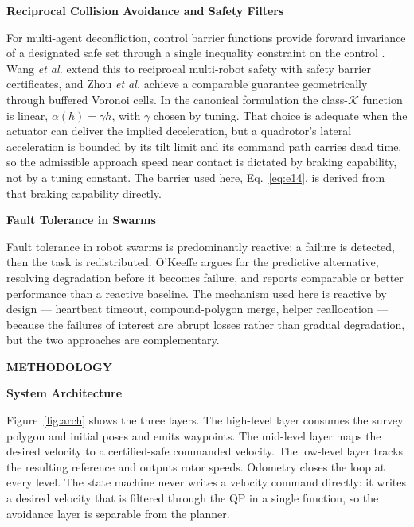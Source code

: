 \documentclass[10pt,letterpaper]{article}
\newcommand{\headingone}[1]{%
    \par\vspace{9pt}%
    {\centering\fontsize{12}{14}\selectfont\bfseries\MakeUppercase{#1}\par}%
    \vspace{4pt}\noindent\ignorespaces}
\newcommand{\headingtwo}[1]{%
    \par\vspace{7pt}%
    {\centering\fontsize{12}{14}\selectfont\bfseries #1\par}%
    \vspace{3pt}\noindent\ignorespaces}
\newcommand{\cit}[1]{\cite{#1}}
\begin{document}
\headingtwo{Reciprocal Collision Avoidance and Safety Filters}

For multi-agent deconfliction, control barrier functions provide forward invariance of a
designated safe set through a single inequality constraint on the control
\cit{amesControlBarrierFunction2017,amesControlBarrierFunctions2019}. Wang \emph{et al.}
\cit{wangSafetyBarrierCertificates2017} extend this to reciprocal multi-robot safety with
safety barrier certificates, and Zhou \emph{et al.} \cit{zhouBufferedVoronoiCells2017}
achieve a comparable guarantee geometrically through buffered Voronoi cells. In the
canonical formulation the class-$\mathcal{K}$ function is linear, $\alpha(h)=\gamma h$,
with $\gamma$ chosen by tuning. That choice is adequate when the actuator can deliver the
implied deceleration, but a quadrotor's lateral acceleration is bounded by its tilt limit
and its command path carries dead time, so the admissible approach speed near contact is
dictated by braking capability, not by a tuning constant. The barrier used here,
Eq.~\eqref{eq:e14}, is derived from that braking capability directly.

\headingtwo{Fault Tolerance in Swarms}

Fault tolerance in robot swarms is predominantly reactive: a failure is detected, then the
task is redistributed. O'Keeffe \cit{okeeffeAnticipatingDegradation2025} argues for the
predictive alternative, resolving degradation before it becomes failure, and reports
comparable or better performance than a reactive baseline. The mechanism used here is
reactive by design --- heartbeat timeout, compound-polygon merge, helper reallocation ---
because the failures of interest are abrupt losses rather than gradual degradation, but
the two approaches are complementary.

\headingone{Methodology}

\headingtwo{System Architecture}

Figure~\ref{fig:arch} shows the three layers. The high-level layer consumes the survey
polygon and initial poses and emits waypoints. The mid-level layer maps the desired
velocity to a certified-safe commanded velocity. The low-level layer tracks the resulting
reference and outputs rotor speeds. Odometry closes the loop at every level. The state
machine never writes a velocity command directly: it writes a desired velocity that is
filtered through the QP in a single function, so the avoidance layer is separable from
the planner.
\end{document}
